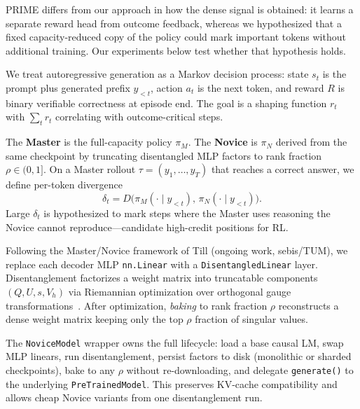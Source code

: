 \documentclass[times, 10pt,twocolumn]{article}
\begin{document}
PRIME differs from our approach in how the dense signal is obtained: it learns
a separate reward head from outcome feedback, whereas we hypothesized that a
fixed capacity-reduced copy of the policy could mark important tokens without
additional training. Our experiments below test whether that hypothesis holds.




We treat autoregressive generation as a Markov decision process: state $s_t$ is
the prompt plus generated prefix $y_{<t}$, action $a_t$ is the next token, and
reward $R$ is binary verifiable correctness at episode end. The goal is a shaping
function $r_t$ with $\sum_t r_t$ correlating with outcome-critical steps.

The \textbf{Master} is the full-capacity policy $\pi_M$. The \textbf{Novice} is
$\pi_N$ derived from the same checkpoint by truncating disentangled MLP factors
to rank fraction $\rho \in (0,1]$. On a Master rollout $\tau = (y_1,\ldots,y_T)$
that reaches a correct answer, we define per-token divergence
\begin{equation}
\delta_t = D\bigl(\pi_M(\cdot \mid y_{<t}),\, \pi_N(\cdot \mid y_{<t})\bigr).
\end{equation}
Large $\delta_t$ is hypothesized to mark steps where the Master uses reasoning
the Novice cannot reproduce---candidate high-credit positions for RL.



Following the Master/Novice framework of Till (ongoing work, sebis/TUM), we
replace each decoder MLP \texttt{nn.Linear} with a
\texttt{DisentangledLinear} layer. Disentanglement factorizes a weight matrix
into truncatable components $(Q, U, s, V_h)$ via Riemannian optimization over
orthogonal gauge transformations~\cite{wei2025tensor}. After optimization,
\emph{baking} to rank fraction $\rho$ reconstructs a dense weight matrix
keeping only the top $\rho$ fraction of singular values.

The \texttt{NoviceModel} wrapper owns the full lifecycle: load a base causal LM,
swap MLP linears, run disentanglement, persist factors to disk (monolithic or
sharded checkpoints), bake to any $\rho$ without re-downloading, and delegate
\texttt{generate()} to the underlying \texttt{PreTrainedModel}. This preserves
KV-cache compatibility and allows cheap Novice variants from one disentanglement
run.
\end{document}

